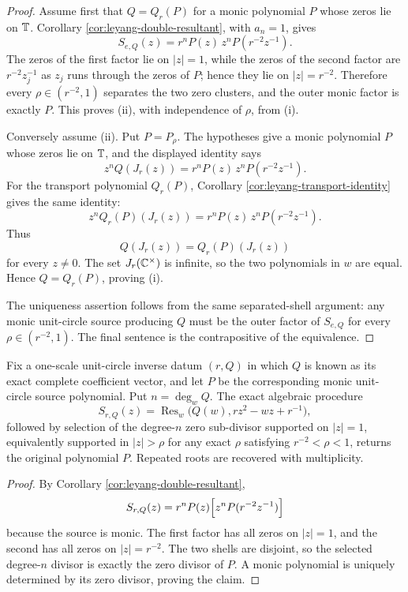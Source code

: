 \begin{proof}
Assume first that \(Q=Q_r(P)\) for a monic polynomial \(P\) whose zeros lie on \(\mathbb{T}\).  Corollary \ref{cor:leyang-double-resultant}, with \(a_n=1\), gives
\[
S_{e,Q}(z)=r^nP(z)\,z^nP\!\left(r^{-2}z^{-1}\right).
\]
The zeros of the first factor lie on \(|z|=1\), while the zeros of the second factor are \(r^{-2}z_j^{-1}\) as \(z_j\) runs through the zeros of \(P\); hence they lie on \(|z|=r^{-2}\).  Therefore every \(\rho\in(r^{-2},1)\) separates the two zero clusters, and the outer monic factor is exactly \(P\).  This proves \textup{(ii)}, with independence of \(\rho\), from \textup{(i)}.

Conversely assume \textup{(ii)}.  Put \(P=P_\rho\).  The hypotheses give a monic polynomial \(P\) whose zeros lie on \(\mathbb{T}\), and the displayed identity says
\[
z^nQ(J_r(z))=r^nP(z)\,z^nP(r^{-2}z^{-1}).
\]
For the transport polynomial \(Q_r(P)\), Corollary \ref{cor:leyang-transport-identity} gives the same identity:
\[
z^nQ_r(P)(J_r(z))=r^nP(z)\,z^nP(r^{-2}z^{-1}).
\]
Thus
\[
Q(J_r(z))=Q_r(P)(J_r(z))
\]
for every \(z\ne0\).  The set \(J_r(\mathbb{C}^\times)\) is infinite, so the two polynomials in \(w\) are equal.  Hence \(Q=Q_r(P)\), proving \textup{(i)}.

The uniqueness assertion follows from the same separated-shell argument: any monic unit-circle source producing \(Q\) must be the outer factor of \(S_{e,Q}\) for every \(\rho\in(r^{-2},1)\).  The final sentence is the contrapositive of the equivalence.
\end{proof}

\begin{proposition}\label{prop:exact-shell-recovery}
Fix a one-scale unit-circle inverse datum \((r,Q)\) in which \(Q\) is known as its exact complete coefficient vector, and let \(P\) be the corresponding monic unit-circle source polynomial.  Put \(n=\deg_w Q\).  The exact algebraic procedure
\[
S_{r,Q}(z)=\operatorname{Res}_w\!\bigl(Q(w),rz^2-wz+r^{-1}\bigr),
\]
followed by selection of the degree-\(n\) zero sub-divisor supported on \(|z|=1\), equivalently supported in \(|z|>\rho\) for any exact \(\rho\) satisfying \(r^{-2}<\rho<1\), returns the original polynomial \(P\).  Repeated roots are recovered with multiplicity.
\end{proposition}

\begin{proof}
By Corollary \ref{cor:leyang-double-resultant},
\[
S_{r,Q}(z)=r^nP(z)\Bigl[z^nP(r^{-2}z^{-1})\Bigr]
\]
because the source is monic.  The first factor has all zeros on \(|z|=1\), and the second has all zeros on \(|z|=r^{-2}\).  The two shells are disjoint, so the selected degree-\(n\) divisor is exactly the zero divisor of \(P\).  A monic polynomial is uniquely determined by its zero divisor, proving the claim.
\end{proof}

